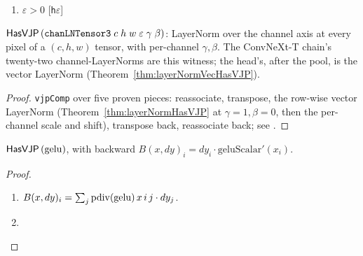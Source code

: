 \begin{theorem}
  \label{thm:chanLNTensor3HasVJP}
  \leanok
  \Assume{}
  \begin{enumerate}
    \item \(\varepsilon > 0\) \hfill[\texttt{h\(\varepsilon\)}]
  \end{enumerate}
  \Prove{}
  \(\mathsf{HasVJP}\,(\texttt{chanLNTensor3}\; c\; h\; w\; \varepsilon\; \gamma\; \beta)\):
  LayerNorm over the channel axis at every pixel of a \((c, h, w)\) tensor,
  with per-channel \(\gamma, \beta\). The ConvNeXt-T chain's twenty-two
  channel-LayerNorms are this witness; the head's, after the pool, is the
  vector LayerNorm (Theorem~\ref{thm:layerNormVecHasVJP}).
\end{theorem}

\begin{proof}
\leanok
\texttt{vjpComp} over five proven pieces: reassociate, transpose, the
row-wise vector LayerNorm (Theorem~\ref{thm:layerNormHasVJP} at
\(\gamma = 1, \beta = 0\), then the per-channel scale and shift), transpose
back, reassociate back; see .
\end{proof}

\begin{theorem}
  \label{thm:geluHasVJP}
  \leanok
  \(\mathsf{HasVJP}\, (\mathrm{gelu})\), with backward
  \(B(x, dy)_i = dy_i \cdot \mathrm{geluScalar}'(x_i)\).
\end{theorem}

\begin{proof}
\leanok
\begin{enumerate}
  \item \Suffices{} \(B(x, dy)_i = \sum_j \operatorname{pdiv}(\mathrm{gelu})\,
    x\, i\, j \cdot dy_j\). 
  \item \Qed{}
\end{enumerate}
\end{proof}

